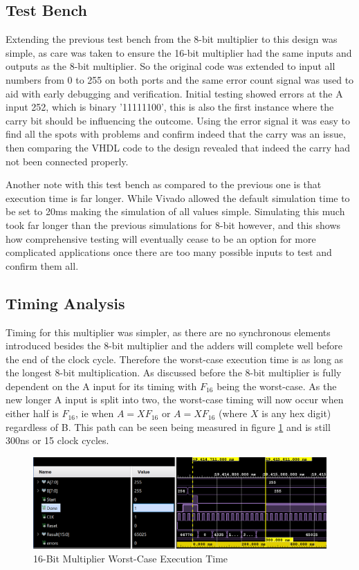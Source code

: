 \documentclass[11pt]{article}
\begin{document}
\subsection{Test Bench}
Extending the previous test bench from the 8-bit multiplier to this design was simple,
as care was taken to ensure the 16-bit multiplier had the same inputs and outputs as the 8-bit multiplier.
So the original code was extended to input all numbers from 0 to 255 on both ports and the same error count signal was used to aid with early debugging and verification.
Initial testing showed errors at the A input 252, which is binary '11111100', this is also the first instance where the carry bit should be influencing the outcome.
Using the error signal it was easy to find all the spots with problems and confirm indeed that the carry was an issue,
then comparing the VHDL code to the design revealed that indeed the carry had not been connected properly.

Another note with this test bench as compared to the previous one is that execution time is far longer.
While Vivado allowed the default simulation time to be set to 20ms making the simulation of all values simple.
Simulating this much took far longer than the previous simulations for 8-bit however, and this shows how comprehensive testing will eventually cease to be an option for more complicated applications once there are too many possible inputs to test and confirm them all.

\subsection{Timing Analysis}
Timing for this multiplier was simpler, as there are no synchronous elements introduced besides the 8-bit multiplier and the adders will complete well before the end of the clock cycle.
Therefore the worst-case execution time is as long as the longest 8-bit multiplication.
As discussed before the 8-bit multiplier is fully dependent on the A input for its timing with $F_{16}$ being the worst-case.
As the new longer A input is split into two, the worst-case timing will now occur when either half is $F_{16}$, ie when $A = XF_{16}$ or $A = XF_{16}$ (where $X$ is any hex digit) regardless of B.
This path can be seen being measured in figure \ref{fig:8bit_worst} and is still 300ns or 15 clock cycles.

\begin{figure}[H]         
    \centering
    \includegraphics[width=\textwidth]{16bit_worst.png}
    \caption{16-Bit Multiplier Worst-Case Execution Time}
    \label{fig:8bit_worst}
\end{figure} 
\end{document}
